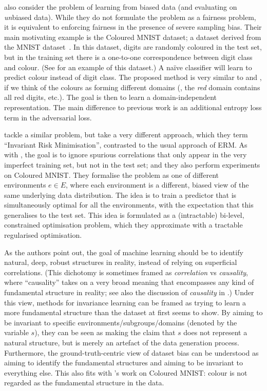 \citet{kim2019learning} also consider the problem of learning from biased data (and evaluating on \emph{un}biased data).
While they do not formulate the problem as a fairness problem,
it is equivalent to enforcing fairness in the presence of severe sampling bias.
Their main motivating example is the Coloured MNIST dataset;
a dataset derived from the MNIST dataset~\citep{lecun1994mnist}.
In this dataset, digits are randomly coloured in the test set,
but in the training set there is a one-to-one correspondence between digit class and colour.
(See  for an example of this dataset.)
A na\"ive classifier will learn to predict colour instead of digit class.
The proposed method is very similar to \citet{ganin2016domain} and \citet{edwards2016censoring},
if we think of the colours as forming different domains
(\ie, the \emph{red} domain contains all red digits, etc.).
The goal is then to learn a domain-independent representation.
The main difference to previous work is an additional entropy loss term in the adversarial loss.

\citet{arjovsky2019invariant} tackle a similar problem, but take a very different approach,
which they term ``Invariant Risk Minimisation'', contrasted to the usual approach of \acf{ERM}.
As with \citet{kim2019learning},
the goal is to ignore spurious correlations that only appear in the very imperfect training set,
but not in the test set;
and they also perform experiments on Coloured MNIST.
They formalise the problem as one of different environments $e\in E$,
where each environment is a different, biased view of the same underlying data distribution.
The idea is to train a predictor that is simultaneously optimal for all the environments,
with the expectation that this generalises to the test set.
This idea is formulated as a (intractable) bi-level, constrained optimisation problem,
which they approximate with a tractable regularised optimisation.

As the authors point out,
the goal of machine learning should be to identify natural, deep, robust structures in reality,
instead of relying on superficial correlations.
(This dichotomy is sometimes framed as \emph{correlation} vs \emph{causality},
where ``causality'' takes on a very broad meaning that encompasses any kind of fundamental structure in reality; see also the discussion of \emph{causality} in .)
Under this view, methods for invariance learning can be framed as trying to learn a more fundamental structure
than the dataset at first seems to show.
By aiming to be invariant to specific environments/subgroups/domains (denoted by the variable \(s\)),
they can be seen as making the claim that \(s\) does not represent a natural structure,
but is merely an artefact of the data generation process.
Furthermore, the ground-truth-centric view of dataset bias can be understood as
aiming to identify the fundamental structures and aiming to be invariant to everything else.
This also fits with \citet{kim2019learning}'s work on Coloured MNIST:
colour is not regarded as the fundamental structure in the data.

